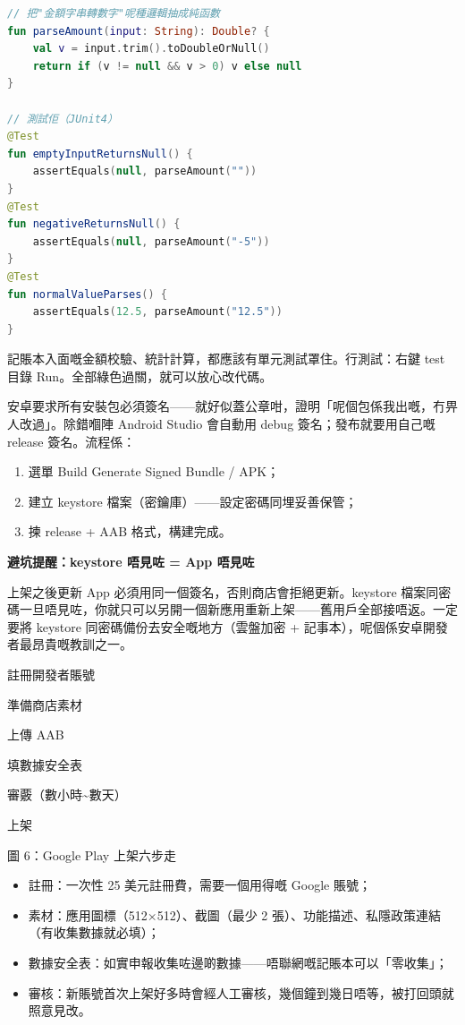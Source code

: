 \begin{lstlisting}[language=Kotlin]
// 把"金額字串轉數字"呢種邏輯抽成純函數
fun parseAmount(input: String): Double? {
    val v = input.trim().toDoubleOrNull()
    return if (v != null && v > 0) v else null
}

// 測試佢（JUnit4）
@Test
fun emptyInputReturnsNull() {
    assertEquals(null, parseAmount(""))
}
@Test
fun negativeReturnsNull() {
    assertEquals(null, parseAmount("-5"))
}
@Test
fun normalValueParses() {
    assertEquals(12.5, parseAmount("12.5"))
}
\end{lstlisting}

記賬本入面嘅金額校驗、統計計算，都應該有單元測試罩住。行測試：右鍵 test 目錄 Run。全部綠色過關，就可以放心改代碼。


安卓要求所有安裝包必須簽名——就好似蓋公章咁，證明「呢個包係我出嘅，冇畀人改過」。除錯嗰陣 Android Studio 會自動用 debug 簽名；發布就要用自己嘅 release 簽名。流程係：

\begin{enumerate}
  \item 選單 Build Generate Signed Bundle / APK；
  \item 建立 keystore 檔案（密鑰庫）——設定密碼同埋妥善保管；
  \item 揀 release + AAB 格式，構建完成。
\end{enumerate}

\textbf{避坑提醒：keystore 唔見咗 = App 唔見咗}\par

上架之後更新 App 必須用同一個簽名，否則商店會拒絕更新。keystore 檔案同密碼一旦唔見咗，你就只可以另開一個新應用重新上架——舊用戶全部接唔返。一定要將 keystore 同密碼備份去安全嘅地方（雲盤加密 + 記事本），呢個係安卓開發者最昂貴嘅教訓之一。


註冊開發者賬號

準備商店素材

上傳 AAB

填數據安全表

審覈（數小時\textasciitilde{}數天）

上架

\begin{center}\small\color{gray}圖 6：Google Play 上架六步走\end{center}

\begin{itemize}
  \item 註冊：一次性 25 美元註冊費，需要一個用得嘅 Google 賬號；
  \item 素材：應用圖標（512×512）、截圖（最少 2 張）、功能描述、私隱政策連結（有收集數據就必填）；
  \item 數據安全表：如實申報收集咗邊啲數據——唔聯網嘅記賬本可以「零收集」；
  \item 審核：新賬號首次上架好多時會經人工審核，幾個鐘到幾日唔等，被打回頭就照意見改。
\end{itemize}

